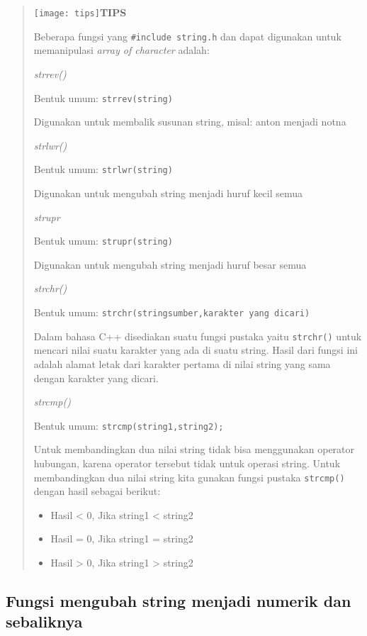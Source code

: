 \begin{quotation}
\texttt{[image: tips]}\textbf{TIPS}

Beberapa fungsi yang \texttt{\#include\ string.h} dan dapat digunakan
untuk memanipulasi \emph{array of character} adalah:

\emph{strrev()}

Bentuk umum: \texttt{strrev(string)}

Digunakan untuk membalik susunan string, misal: anton menjadi notna

\emph{strlwr()}

Bentuk umum: \texttt{strlwr(string)}

Digunakan untuk mengubah string menjadi huruf kecil semua

\emph{strupr}

Bentuk umum: \texttt{strupr(string)}

Digunakan untuk mengubah string menjadi huruf besar semua

\emph{strchr()}

Bentuk umum: \texttt{strchr(stringsumber,karakter\ yang\ dicari)}

Dalam bahasa C++ disediakan suatu fungsi pustaka yaitu \texttt{strchr()}
untuk mencari nilai suatu karakter yang ada di suatu string. Hasil dari
fungsi ini adalah alamat letak dari karakter pertama di nilai string
yang sama dengan karakter yang dicari.

\emph{strcmp()}

Bentuk umum: \texttt{strcmp(string1,string2);}

Untuk membandingkan dua nilai string tidak bisa menggunakan operator
hubungan, karena operator tersebut tidak untuk operasi string. Untuk
membandingkan dua nilai string kita gunakan fungsi pustaka
\texttt{strcmp()} dengan hasil sebagai berikut:

\begin{itemize}

\item
Hasil \textless{} 0, Jika string1 \textless{} string2
\item
Hasil = 0, Jika string1 = string2
\item
Hasil \textgreater{} 0, Jika string1 \textgreater{} string2
\end{itemize}
\end{quotation}


\subsection{Fungsi mengubah string menjadi numerik dan sebaliknya}\label{fungsi-mengubah-string-menjadi-numerik-dan-sebaliknya}

